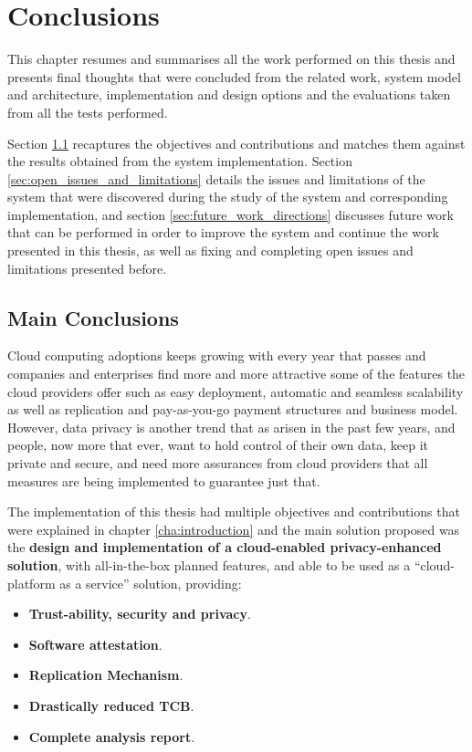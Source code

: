 
\chapter{Conclusions}
\label{cha:conclusions}

This chapter resumes and summarises all the work performed on this thesis and presents final thoughts that were concluded from the related work, system model and architecture, implementation and design options and the evaluations taken from all the tests performed.

Section \ref{sec:main_conclusion} recaptures the objectives and contributions and matches them against the results obtained from the system implementation. Section \ref{sec:open_issues_and_limitations} details the issues and limitations of the system that were discovered during the study of the system and corresponding implementation, and section \ref{sec:future_work_directions} discusses future work that can be performed in order to improve the system and continue the work presented in this thesis, as well as fixing and completing open issues and limitations presented before.

\section{Main Conclusions}
\label{sec:main_conclusion}

Cloud computing adoptions keeps growing with every year that passes and companies and enterprises find more and more attractive some of the features the cloud providers offer such as easy deployment, automatic and seamless scalability as well as replication and pay-as-you-go payment structures and business model. However, data privacy is another trend that as arisen in the past few years, and people, now more that ever, want to hold control of their own data, keep it private and secure, and need more assurances from cloud providers that all measures are being implemented to guarantee just that.

The implementation of this thesis had multiple objectives and contributions that were explained in chapter \ref{cha:introduction} and the main solution proposed was the \textbf{design and implementation of a cloud-enabled privacy-enhanced solution}, with all-in-the-box planned features, and able to be used as a “cloud-platform as a service” solution, providing:

\begin{itemize}
	\item \textbf{Trust-ability, security and privacy}.
	\item \textbf{Software attestation}.
 	\item \textbf{Replication Mechanism}.
  	\item \textbf{Drastically reduced TCB}.
  	\item \textbf{Complete analysis report}. 
\end{itemize}


